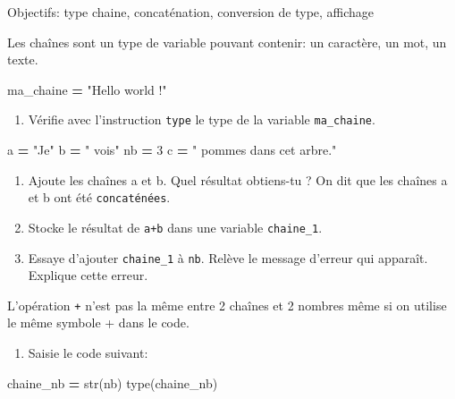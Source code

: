 \documentclass[
]{book}
\newenvironment{Shaded}{\begin{snugshade}}{\end{snugshade}}
\newcommand{\BuiltInTok}[1]{#1}
\newcommand{\DecValTok}[1]{\textcolor[rgb]{0.00,0.00,0.81}{#1}}
\newcommand{\NormalTok}[1]{#1}
\newcommand{\OperatorTok}[1]{\textcolor[rgb]{0.81,0.36,0.00}{\textbf{#1}}}
\newcommand{\StringTok}[1]{\textcolor[rgb]{0.31,0.60,0.02}{#1}}
\providecommand{\tightlist}{%
  \setlength{\itemsep}{0pt}\setlength{\parskip}{0pt}}
\def\tightlist{}
\begin{document}
Objectifs: type chaine, concaténation, conversion de type, affichage

Les chaînes sont un type de variable pouvant contenir: un caractère, un mot, un texte.

\begin{Shaded}
\begin{Highlighting}[]
\NormalTok{ma\_chaine }\OperatorTok{=} \StringTok{"Hello world !"}
\end{Highlighting}
\end{Shaded}

\begin{enumerate}
\def\labelenumi{\arabic{enumi}.}
\tightlist
\item
  Vérifie avec l'instruction \texttt{type} le type de la variable \texttt{ma\_chaine}.
\end{enumerate}

\begin{Shaded}
\begin{Highlighting}[]
\NormalTok{a }\OperatorTok{=} \StringTok{"Je"}
\NormalTok{b }\OperatorTok{=} \StringTok{" vois"}
\NormalTok{nb }\OperatorTok{=} \DecValTok{3}
\NormalTok{c }\OperatorTok{=} \StringTok{" pommes dans cet arbre."}
\end{Highlighting}
\end{Shaded}

\begin{enumerate}
\def\labelenumi{\arabic{enumi}.}
\setcounter{enumi}{1}
\tightlist
\item
  Ajoute les chaînes a et b. Quel résultat obtiens-tu ? On dit que les chaînes a et b ont été \texttt{concaténées}.
\item
  Stocke le résultat de \texttt{a+b} dans une variable \texttt{chaine\_1}.
\item
  Essaye d'ajouter \texttt{chaine\_1} à \texttt{nb}. Relève le message d'erreur qui apparaît. Explique cette erreur.
\end{enumerate}

L'opération \texttt{+} n'est pas la même entre 2 chaînes et 2 nombres même si on utilise le même symbole + dans le code.

\begin{enumerate}
\def\labelenumi{\arabic{enumi}.}
\setcounter{enumi}{4}
\tightlist
\item
  Saisie le code suivant:
\end{enumerate}

\begin{Shaded}
\begin{Highlighting}[]
\NormalTok{chaine\_nb }\OperatorTok{=} \BuiltInTok{str}\NormalTok{(nb)}
\BuiltInTok{type}\NormalTok{(chaine\_nb)}
\end{Highlighting}
\end{Shaded}
\end{document}
